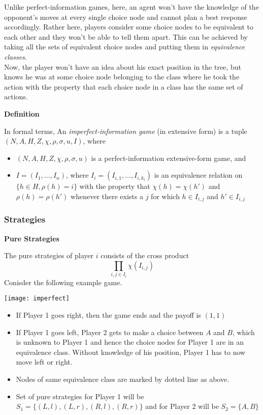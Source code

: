 Unlike perfect-information games, here, an agent won't have the knowledge of the opponent's moves at every single choice node and cannot plan a best response accordingly. Rather here, players consider some choice nodes to be equivalent to each other and they won't be able to tell them apart. This can be achieved by taking all the sets of equivalent choice nodes and putting them in \textit{equivalence classes}. \\
Now, the player won't have an idea about his exact position in the tree, but knows he was at some choice node belonging to the class where he took the action with the property that each choice node in a class has the same set of actions.
\begin{flushleft}
\textbf{Definition}
\end{flushleft}
In formal terms, An \textit{imperfect-information game} (in extensive form) is a tuple $(N, A, H, Z, \chi,  \rho, \sigma, u, I)$, where
\begin{itemize}
\item $(N, A, H, Z, \chi,  \rho, \sigma, u)$ is a perfect-information extensive-form game, and
\item $I = (I_1, \dots , I_n)$, where $I_i = (I_{i,1}, \dots , I_{i, k_i})$ is an equivalence relation on $\{ h \in H, \rho(h) = i\}$ with the property that $\chi(h) = \chi(h')$ and $\rho(h) = \rho(h')$ whenever there exists a $j$ for which $h \in I_{i,j}$ and $h' \in I_{i,j}$
\end{itemize}

\subsubsection{Strategies}
\begin{flushleft}
\textbf{Pure Strategies}
\end{flushleft}
The pure strategies of player $i$ consists of the cross product $$\prod_{i, j\in I_i} \chi(I_{i,j}) $$ 
Conisder the following example game.
\begin{center}
\texttt{[image: imperfect]}
\end{center}
\begin{itemize}
\item If Player 1 goes right, then the  game ends and the payoff is $(1,1)$
\item If Player 1 goes left, Player 2 gets to make a choice between $A$ and $B$, which is unknown to Player 1 and hence the choice nodes for Player 1 are in an equivalence class. Without knowledge of his position, Player 1 has to now move left or right.
\item Nodes of same equivalence class are marked by dotted line as above.
\item Set of pure strategies for Player 1 will be $S_1 =\{(L, l), (L, r), (R, l), (R, r)\}$ and for Player 2 will be $S_2 = \{A, B\}$
\end{itemize}

